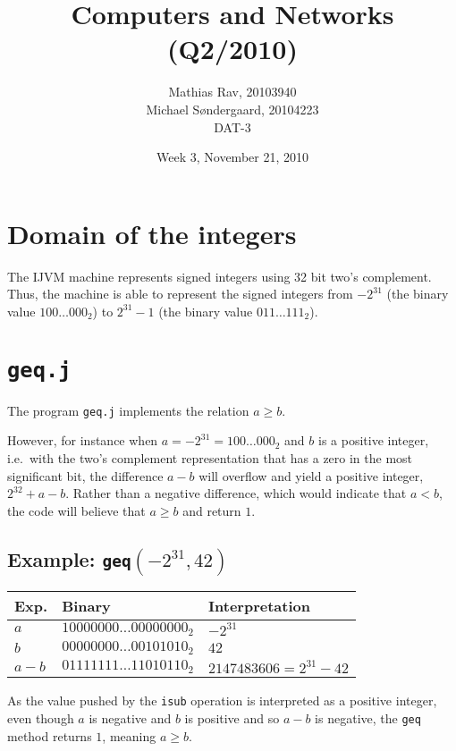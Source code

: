 \documentclass[12pt,a4paper]{article}
\title{Computers and Networks (Q2/2010)}
\author{Mathias Rav, 20103940 \\
		Michael Søndergaard, 20104223 \\
		DAT-3}
\date{Week 3, November 21, 2010}
\begin{document}
\maketitle
\section{Domain of the integers}
The IJVM machine represents signed integers using 32 bit two's complement.
Thus, the machine is able to represent the signed integers from $-2^{31}$ (the
binary value $100\dots000_2$) to $2^{31}-1$ (the binary value $011\dots111_2$).
\section{\texttt{geq.j}}
The program \texttt{geq.j} implements the relation $a\geq b$. 

However, for instance when $a=-2^{31}=100\dots000_2$ and $b$ is a positive
integer, i.e.\ with the two's complement representation that has a zero in the
most significant bit, the difference $a-b$ will overflow and yield a positive
integer, $2^{32}+a-b$. Rather than a negative difference, which would indicate
that $a<b$, the code will believe that $a\geq b$ and return $1$.
\subsection{Example: \texttt{geq}$(-2^{31}, 42)$}
\begin{tabular}{lll}
	Exp. & Binary & Interpretation \\
	\hline
	$a$ &   $10000000 \dots 00000000_2$ & $-2^{31}$ \\
	$b$ &   $00000000 \dots 00101010_2$ & $42$ \\
	$a-b$ & $01111111 \dots 11010110_2$ & $2147483606=2^{31}-42$
\end{tabular}

As the value pushed by the \texttt{isub} operation is interpreted as a positive
integer, even though $a$ is negative and $b$ is positive and so $a-b$ is
negative, the \texttt{geq} method returns $1$, meaning $a\geq b$.
\end{document}
